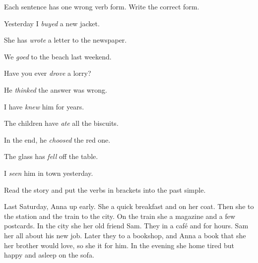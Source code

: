 \documentclass[11pt]{article}
\begin{document}
%
  {Each sentence has one wrong verb form. Write the correct form.}

\begin{gapexercise}
  \item Yesterday I \textit{buyed} a new jacket.            \hfill {}
  \item She has \textit{wrote} a letter to the newspaper.    \hfill {}
  \item We \textit{goed} to the beach last weekend.          \hfill {}
  \item Have you ever \textit{drove} a lorry?                \hfill {}
  \item He \textit{thinked} the answer was wrong.            \hfill {}
  \item I have \textit{knew} him for years.                  \hfill {}
  \item The children have \textit{ate} all the biscuits.     \hfill {}
  \item In the end, he \textit{choosed} the red one.         \hfill {}
  \item The glass has \textit{fell} off the table.           \hfill {}
  \item I \textit{seen} him in town yesterday.               \hfill {}
\end{gapexercise}

\clearpage


%
  {Read the story and put the verbs in brackets into the past simple.}

{\linespread{2.0}\selectfont
Last Saturday, Anna  up early.
She  a quick breakfast and
 on her coat. Then she
 to the station and
 the train to the city.
On the train she  a magazine and
 a few postcards.
In the city she  her old friend Sam.
They  in a café and
 for hours.
Sam  her all about his new job.
Later they  to a bookshop, and Anna
 a book that she
 her brother would love, so she
 it for him.
In the evening she  home tired but happy
and  asleep on the sofa.
\par}
\end{document}

